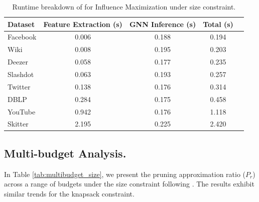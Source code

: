 {\begin{table}[h!]
\centering
\caption{Runtime breakdown of \llm for Influence Maximization under size constraint.}
\label{tab:runtime_breakdown}
\begin{tabular}{lcccc}
\toprule
\textbf{Dataset} & \textbf{Feature Extraction (s)} & \textbf{GNN Inference (s)} & \textbf{Total (s)} \\
\midrule
Facebook & 0.006 & 0.188 & 0.194 \\
Wiki     & 0.008 & 0.195 & 0.203 \\
Deezer   & 0.058 & 0.177 & 0.235 \\
Slashdot & 0.063 & 0.193 & 0.257 \\
Twitter  & 0.138 & 0.176 & 0.314 \\
DBLP     & 0.284 & 0.175 & 0.458 \\
YouTube  & 0.942 & 0.176 & 1.118 \\
Skitter  & 2.195 & 0.225 & 2.420 \\
\bottomrule
\end{tabular}
\end{table}

\subsection{Multi-budget Analysis.}

In Table \ref{tab:multibudget_size}, we present the pruning approximation ratio ($P_r$) across a range of budgets under the size constraint following \cite{ireland2022lense}. The results exhibit similar trends for the knapsack constraint.

}
